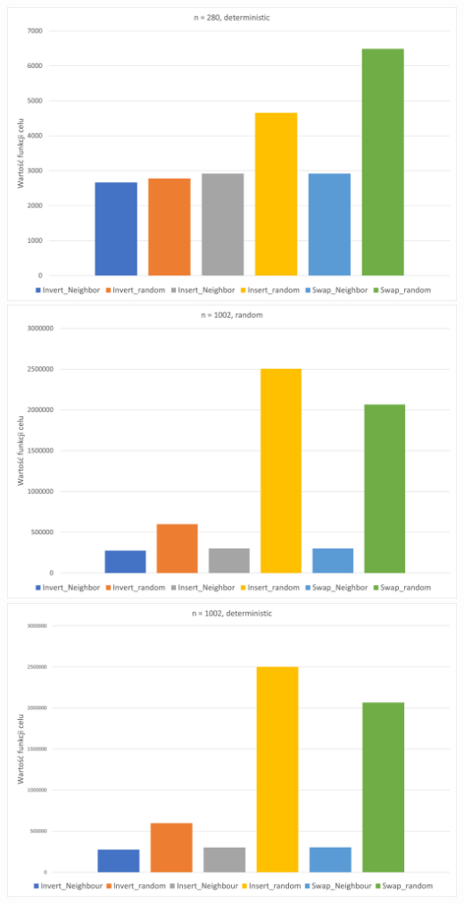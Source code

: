 \documentclass{article}
\begin{document}
\includegraphics[scale=0.36]{280_deter}
\includegraphics[scale=0.36]{1002_rand}
\includegraphics[scale=0.36]{1002_deter}
\end{document}
